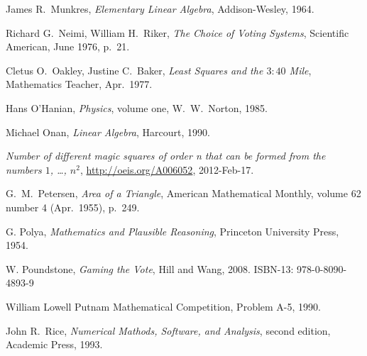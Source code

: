 \begin{thebibliography}{\makebox[2em][c]{{}\hfil{}}}
  James R.\ Munkres,
  \emph{Elementary Linear Algebra},
  Addison-Wesley,
  1964.

  Richard G.~Neimi, William H.~Riker,
  \emph{The Choice of Voting Systems},
  Scientific American,
  June 1976,
  p.~21.



  Cletus O.\ Oakley, Justine C.\ Baker,
  \emph{Least Squares and the $3:40$ Mile},
  Mathematics Teacher,
  Apr.\ 1977.

  Hans O'Hanian,
  \emph{Physics},
  volume one,
  W.\ W.\ Norton,
  1985.

  Michael Onan,
  \emph{Linear Algebra},
  Harcourt,
  1990.

  \emph{Number of different magic squares of order n that can be formed from the numbers $1$, \ldots, $n^2$},
  \url{http://oeis.org/A006052},
  2012-Feb-17.

  G.\ M.\ Petersen,
  \emph{Area of a Triangle},
  American Mathematical Monthly,
  volume 62 number 4 (Apr.\ 1955),
  p.~249.

  G. Polya,
  \emph{Mathematics and Plausible Reasoning},
  Princeton University Press,
  1954.

  W. Poundstone,
  \emph{Gaming the Vote},
  Hill and Wang, 2008.
  ISBN-13: 978-0-8090-4893-9 



  William Lowell Putnam Mathematical Competition,
  Problem A-5, 1990.

  John R.\ Rice,
  \emph{Numerical Mathods, Software, and Analysis},
  second edition,
  Academic Press,
  1993.


\end{thebibliography}
